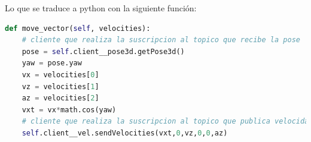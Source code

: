 \begin{itemize}
\begin{itemize}
Lo que se traduce a python con la siguiente función:\\
  	
\begin{lstlisting}[language=python,firstnumber=1]
 def move_vector(self, velocities):
    # cliente que realiza la suscripcion al topico que recibe la pose
    pose = self.client__pose3d.getPose3d()
    yaw = pose.yaw
    vx = velocities[0]
    vz = velocities[1]
    az = velocities[2]
    vxt = vx*math.cos(yaw)
    # cliente que realiza la suscripcion al topico que publica velocidades
    self.client__vel.sendVelocities(vxt,0,vz,0,0,az)
\end{lstlisting}
	
	\end{itemize}
\end{itemize}



